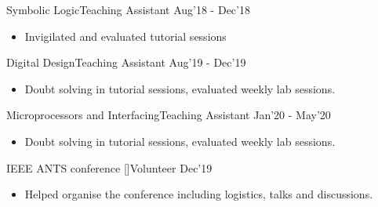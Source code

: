 \begin{projects}

\projecta
	{Symbolic Logic}{Teaching Assistant} {Aug'18 - Dec'18}
	{\begin{itemize}
	    \item Invigilated and evaluated tutorial sessions
	\end{itemize}
	}
	
 \projecta
	{Digital Design}{Teaching Assistant} {Aug'19 - Dec'19}
	{\begin{itemize}
	    \item Doubt solving in tutorial sessions, evaluated weekly lab sessions.
	\end{itemize}
	}
	
\projecta
	{Microprocessors and Interfacing}{Teaching Assistant} {Jan'20 - May'20}
	{\begin{itemize}
	    \item Doubt solving in tutorial sessions, evaluated weekly lab sessions.
	\end{itemize}
	}
	
\projecta
	{IEEE ANTS conference [\href{https://ants2019.ieee-comsoc-ants.org/}{\small{\websiteSymbol}}]}{Volunteer} {Dec'19}
	{\begin{itemize}
	    \item Helped organise the conference including logistics, talks and discussions. 
	\end{itemize}
	}
	
 \end{projects}
 \vspace{-3mm}
 
 